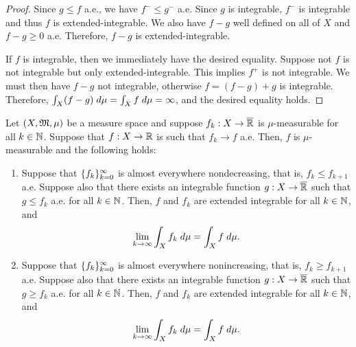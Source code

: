 \documentclass[a4paper]{article}
\begin{document}
\begin{proof}
Since $g \leq f$ a.e., we have $f^- \leq g^-$ a.e. Since
$g$ is integrable, $f^-$ is integrable and thus $f$ is
extended-integrable. We also have $f - g$ well defined
on all of $X$ and $f - g \geq 0$ a.e. Therefore,
$f - g$ is extended-integrable.

If $f$ is integrable, then we immediately have the desired
equality. Suppose not $f$ is not integrable but only
extended-integrable. This implies $f^+$ is not integrable.
We must then have $f - g$ not integrable, otherwise
$f = (f - g) + g$ is integrable. Therefore,
$\int_X (f - g) \; d \mu = \int_X f \; d \mu = \infty$,
and the desired equality holds.
\end{proof}

\begin{thm}
Let $(X, \mathfrak{M}, \mu)$ be a measure space and suppose
$f_k : X \to \overline{\mathbb{R}}$ is $\mu$-measurable for
all $k \in \mathbb{N}$. Suppose that
$f: X \to \mathbb{R}$ is such that $f_k \to f$ a.e. Then,
$f$ is $\mu$-measurable and the following holds:
\begin{enumerate}
\item Suppose that $\{ f_k \}_{k=0}^\infty$ is almost everywhere
nondecreasing, that is, $f_k \leq f_{k+1}$ a.e. Suppose
also that there exists an integrable function
$g : X \to \overline{\mathbb{R}}$ such that $g \leq f_k$ a.e. for all $k \in \mathbb{N}$.
Then, $f$ and $f_k$ are extended integrable for all $k \in \mathbb{N}$,
and
\[
\lim_{k \to \infty} \int_X f_k \; d \mu = \int_X f \; d \mu.
\]

\item Suppose that $\{ f_k \}_{k=0}^\infty$ is almost everywhere
nonincreasing, that is, $f_k \geq f_{k+1}$ a.e. Suppose
also that there exists an integrable function
$g : X \to \overline{\mathbb{R}}$ such that $g \geq f_k$ a.e. for all $k \in \mathbb{N}$.
Then, $f$ and $f_k$ are extended integrable for all $k \in \mathbb{N}$,
and
\[
\lim_{k \to \infty} \int_X f_k \; d \mu = \int_X f \; d \mu.
\]
\end{enumerate}
\end{thm}
\end{document}
